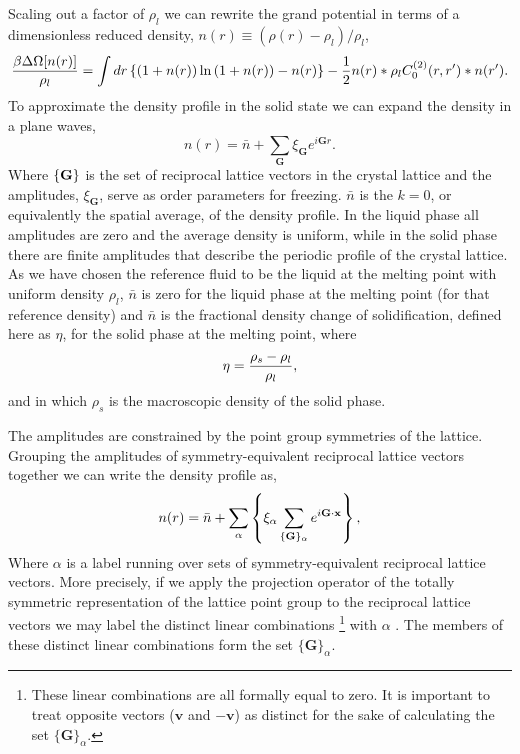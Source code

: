 Scaling out a factor of $\rho_l$ we can rewrite the grand potential in terms of
a dimensionless reduced density, $n(r) \equiv (\rho(r) - \rho_l)/\rho_l$,
%
\begin{equation}
    \label{gp}
    \frac{\beta \Delta \Omega[n(r)]}{\rho_l} =
        \int dr \left\lbrace 
            (1 + n(r))\ln\left(1 + n(r)\right) - n(r)\right\rbrace
        - \frac{1}{2} n(r) \ast \rho_l C^{(2)}_0(r, r^\prime) \ast n(r^\prime).
\end{equation}
%
To approximate the density profile in the solid state we can expand the density
in a plane waves,
%
\begin{equation}
    \label{expansion}
    n(r) = \bar{n} + \sum_{\mathbf{G}} \xi_{\mathbf{G}} e^{i \mathbf{G} r}.
\end{equation}
%
Where $\left\lbrace \mathbf{G} \right\rbrace$ is the set of reciprocal lattice vectors
in the crystal lattice and the amplitudes, $\xi_\mathbf{G}$, serve as order
parameters for freezing. $\bar{n}$ is the $k=0$, or equivalently the spatial
average, of the density profile. In the liquid phase all amplitudes are zero
and the average density is uniform, while in the solid phase there are finite
amplitudes that describe the periodic profile of the crystal lattice. As we
have chosen the reference fluid to be the liquid at the melting point with
uniform density $\rho_l$, $\bar{n}$ is zero for the liquid phase at the melting
point (for that reference density) and $\bar{n}$ is the fractional density
change of solidification, defined here as $\eta$, for the solid phase at the
melting point, where
%
\begin{equation}
    \label{eq:eta_def} 
    \eta = \frac{\rho_s - \rho_l}{\rho_l},
\end{equation}
%
and in which $\rho_s$ is the macroscopic density of the solid phase.

The amplitudes are constrained by the point group symmetries of the lattice.
Grouping the amplitudes of symmetry-equivalent reciprocal lattice vectors
together we can write the density profile as,
%
\begin{equation}
    \label{amplitudes}
    n(r) = \bar{n}
         + \sum_\alpha \left\lbrace
            \xi_\alpha \sum_{\lbrace\mathbf{G}\rbrace_\alpha}
                e^{i\mathbf{G} \cdot \mathbf{x}}\right\rbrace,
\end{equation}
%
Where $\alpha$ is a label running over sets of symmetry-equivalent reciprocal
lattice vectors. More precisely, if we apply the projection operator of the
totally symmetric representation of the lattice point group to the reciprocal
lattice vectors we may label the distinct linear combinations
\footnote{These linear combinations are all formally equal to zero. It is
important to treat opposite vectors ($\mathbf{v}$ and $-\mathbf{v}$) as
distinct for the sake of calculating the set
$\lbrace\mathbf{G}\rbrace_\alpha$.} with $\alpha$ \cite{KIM99}. The members of
these distinct linear combinations form the set
$\lbrace\mathbf{G}\rbrace_\alpha$.

